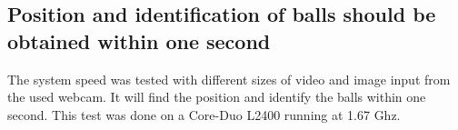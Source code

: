 \subsection{Position and identification of balls should be obtained within one second}

The system speed was tested with different sizes of video and image input from the used webcam. It will find the position and identify the balls within one second. This test was done on a Core-Duo L2400 running at 1.67 Ghz. 
